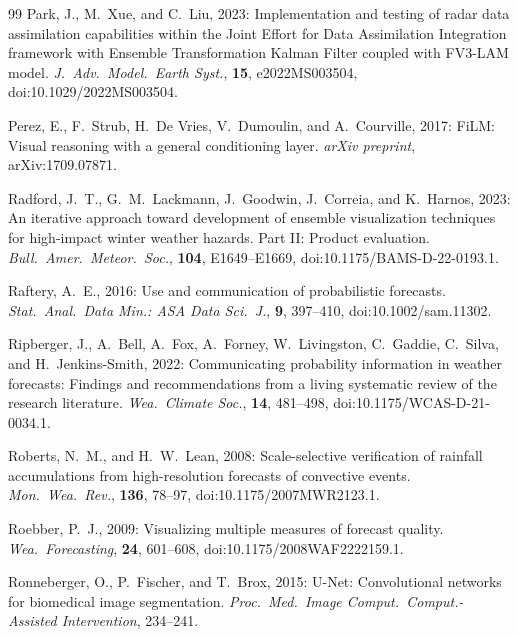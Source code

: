 \documentclass[11pt]{article}
\begin{document}
\begin{thebibliography}{99}
Park, J., M.\ Xue, and C.\ Liu, 2023:
Implementation and testing of radar data assimilation capabilities within the
Joint Effort for Data Assimilation Integration framework with Ensemble
Transformation Kalman Filter coupled with FV3-LAM model.
\textit{J.\ Adv.\ Model.\ Earth Syst.}, \textbf{15}, e2022MS003504,
doi:10.1029/2022MS003504.

Perez, E., F.\ Strub, H.\ De Vries, V.\ Dumoulin, and A.\ Courville, 2017:
FiLM: Visual reasoning with a general conditioning layer.
\textit{arXiv preprint}, arXiv:1709.07871.

Radford, J.~T., G.~M.\ Lackmann, J.\ Goodwin, J.\ Correia,
and K.\ Harnos, 2023:
An iterative approach toward development of ensemble visualization
techniques for high-impact winter weather hazards. Part II:
Product evaluation.
\textit{Bull.\ Amer.\ Meteor.\ Soc.}, \textbf{104}, E1649--E1669,
doi:10.1175/BAMS-D-22-0193.1.

Raftery, A.~E., 2016:
Use and communication of probabilistic forecasts.
\textit{Stat.\ Anal.\ Data Min.: ASA Data Sci.\ J.}, \textbf{9},
397--410, doi:10.1002/sam.11302.

Ripberger, J., A.\ Bell, A.\ Fox, A.\ Forney, W.\ Livingston, C.\ Gaddie,
C.\ Silva, and H.\ Jenkins-Smith, 2022:
Communicating probability information in weather forecasts: Findings and
recommendations from a living systematic review of the research literature.
\textit{Wea.\ Climate Soc.}, \textbf{14}, 481--498,
doi:10.1175/WCAS-D-21-0034.1.

Roberts, N.~M., and H.~W.\ Lean, 2008:
Scale-selective verification of rainfall accumulations from high-resolution
forecasts of convective events.
\textit{Mon.\ Wea.\ Rev.}, \textbf{136}, 78--97,
doi:10.1175/2007MWR2123.1.

Roebber, P.~J., 2009:
Visualizing multiple measures of forecast quality.
\textit{Wea.\ Forecasting}, \textbf{24}, 601--608,
doi:10.1175/2008WAF2222159.1.

Ronneberger, O., P.\ Fischer, and T.\ Brox, 2015:
U-Net: Convolutional networks for biomedical image segmentation.
\textit{Proc.\ Med.\ Image Comput.\ Comput.-Assisted
Intervention}, 234--241.


\end{thebibliography}
\end{document}

